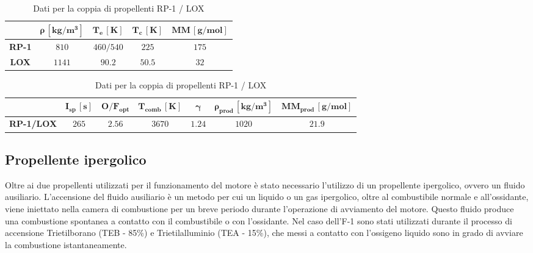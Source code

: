 \begin{table}[H]

\centering
\begin{tabular}{|c|c|c|c|c|}
\hline
& $\bm{\rho \, [kg/m^3]}$ & $\bm{T_{e} \, [K]}$ & $\bm{T_{c} \, [K]}$ & $\bm{MM \, [g/mol]}$ \\
\hline
\textbf{RP-1} & $810$ & $460 / 540$ & $225$ & $175$ \\
\hline
\textbf{LOX} & $1141$ & $90.2$ & $50.5$ & $32$ \\
\hline
\end{tabular}

\vspace{5pt}

\begin{tabular}{|c|c|c|c|c|c|c|}
\hline
& $\bm{I_{sp} \, [s]}$ & $\bm{O/F_{opt}}$ & $\bm{T_{comb} \, [K]}$ & $\bm{\gamma}$ & $\bm{\rho_{prod} \, [kg/m^3]}$ & $\bm{MM_{prod} \, [g/mol]}$ \\
\hline
\textbf{RP-1/LOX} & $265$ & $2.56$ & $3670$ & $1.24$ & $1020$ & $21.9$ \\
\hline
\end{tabular}

\caption{Dati per la coppia di propellenti RP-1 / LOX}
\label{table:dati_propellenti}

\end{table}

\subsection{Propellente ipergolico}
\label{subsec:propellente_ipergolico}

Oltre ai due propellenti utilizzati per il funzionamento del motore è stato necessario l’utilizzo di un propellente ipergolico, ovvero un fluido ausiliario.
L'accensione del fluido ausiliario è un metodo per cui un liquido o un gas ipergolico, oltre al combustibile normale e all'ossidante, viene iniettato nella camera di combustione per un breve periodo durante l'operazione di avviamento del motore. Questo fluido produce una combustione spontanea a contatto con il combustibile o con l'ossidante.
Nel caso dell’F-1 sono stati utilizzati durante il processo di accensione Trietilborano (TEB - 85\%) e Trietilalluminio (TEA - 15\%), che messi a contatto con l’ossigeno liquido sono in grado di avviare la combustione istantaneamente.